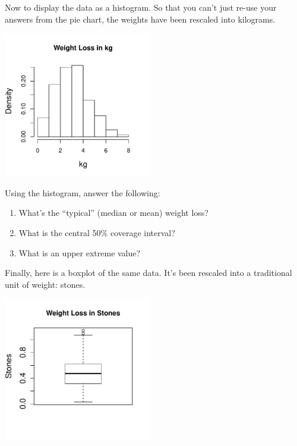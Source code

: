 \bigskip

Now to display the data as a histogram.  So that you can't just re-use
your answers from the pie chart, the weights have been 
rescaled into kilograms.


\centerline{\includegraphics[width=2.5in,trim=35 20 25 0]{Figures/S2008-var2-hist}}

Using the histogram, answer the following:
\begin{enumerate}
\item What's the ``typical'' (median or mean) weight loss?\\
\item What is the central 50\% coverage interval?\\
\item What is an upper extreme value?
\end{enumerate}

\bigskip

Finally, here is a boxplot of the same data.  It's been rescaled into
a traditional unit of weight: stones.


\centerline{\includegraphics[width=2.5in,trim=35 20 25 0]{Figures/S2008-var2-box}}


